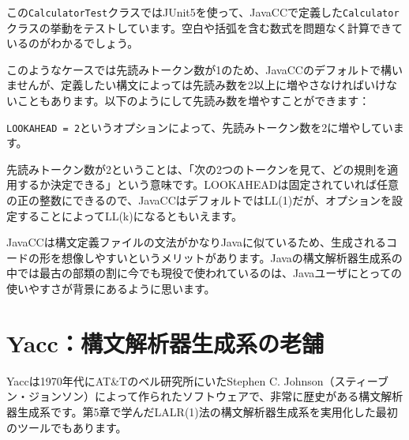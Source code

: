 この\texttt{CalculatorTest}クラスではJUnit5を使って、JavaCCで定義した\texttt{Calculator}クラスの挙動をテストしています。空白や括弧を含む数式を問題なく計算できているのがわかるでしょう。

このようなケースでは先読みトークン数が1のため、JavaCCのデフォルトで構いませんが、定義したい構文によっては先読み数を2以上に増やさなければいけないこともあります。以下のようにして先読み数を増やすことができます：

\begin{Shaded}
\begin{Highlighting}[]
\NormalTok{;}
\NormalTok{;}
\NormalTok{;}
\NormalTok{\}}
\end{Highlighting}
\end{Shaded}

\texttt{LOOKAHEAD\ =\ 2}というオプションによって、先読みトークン数を2に増やしています。

先読みトークン数が2ということは、「次の2つのトークンを見て、どの規則を適用するか決定できる」という意味です。LOOKAHEADは固定されていれば任意の正の整数にできるので、JavaCCはデフォルトではLL(1)だが、オプションを設定することによってLL(k)になるともいえます。

JavaCCは構文定義ファイルの文法がかなりJavaに似ているため、生成されるコードの形を想像しやすいというメリットがあります。Javaの構文解析器生成系の中では最古の部類の割に今でも現役で使われているのは、Javaユーザにとっての使いやすさが背景にあるように思います。

\hypertarget{chapter6-yaccux69cbux6587ux89e3ux6790ux5668ux751fux6210ux7cfbux306eux8001ux8217}{%
\section{Yacc：構文解析器生成系の老舗}\label{chapter6-yaccux69cbux6587ux89e3ux6790ux5668ux751fux6210ux7cfbux306eux8001ux8217}}

Yaccは1970年代にAT\&Tのベル研究所にいたStephen C.
Johnson（スティーブン・ジョンソン）によって作られたソフトウェアで、非常に歴史がある構文解析器生成系です。第5章で学んだLALR(1)法の構文解析器生成系を実用化した最初のツールでもあります。

